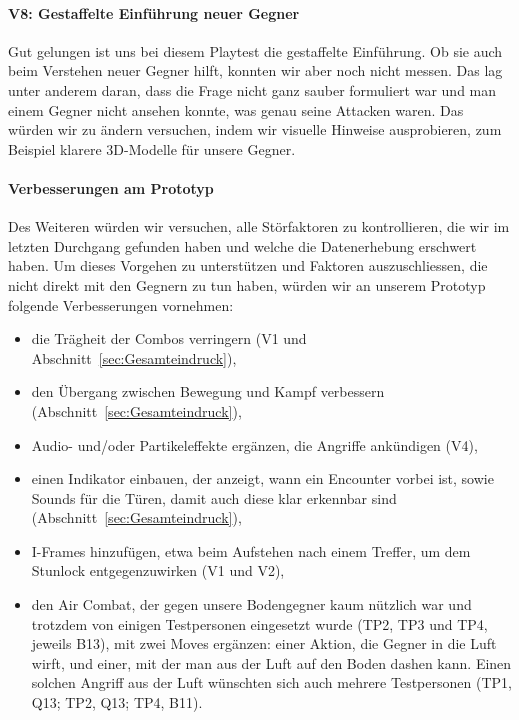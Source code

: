 \documentclass[../Main.tex]{subfiles}
\begin{document}
\paragraph{V8: Gestaffelte Einführung neuer Gegner}
Gut gelungen ist uns bei diesem Playtest die gestaffelte Einführung. Ob sie auch beim Verstehen neuer Gegner hilft, konnten wir aber noch nicht messen. Das lag unter anderem daran, dass die Frage nicht ganz sauber formuliert war und man einem Gegner nicht ansehen konnte, was genau seine Attacken waren. Das würden wir zu ändern versuchen, indem wir visuelle Hinweise ausprobieren, zum Beispiel klarere 3D-Modelle für unsere Gegner.

\paragraph{Verbesserungen am Prototyp}
Des Weiteren würden wir versuchen, alle Störfaktoren zu kontrollieren, die wir im letzten Durchgang gefunden haben und welche die Datenerhebung erschwert haben. Um dieses Vorgehen zu unterstützen und Faktoren auszuschliessen, die nicht direkt mit den Gegnern zu tun haben, würden wir an unserem Prototyp folgende Verbesserungen vornehmen:

\begin{itemize}[leftmargin=1.5cm]
    \item die Trägheit der Combos verringern (V1 und Abschnitt~\ref{sec:Gesamteindruck}),
    \item den Übergang zwischen Bewegung und Kampf verbessern (Abschnitt~\ref{sec:Gesamteindruck}),
    \item Audio- und/oder Partikeleffekte ergänzen, die Angriffe ankündigen (V4),
    \item einen Indikator einbauen, der anzeigt, wann ein Encounter vorbei ist, sowie Sounds für die Türen, damit auch diese klar erkennbar sind (Abschnitt~\ref{sec:Gesamteindruck}),
    \item I-Frames hinzufügen, etwa beim Aufstehen nach einem Treffer, um dem Stunlock entgegenzuwirken (V1 und V2),
    \item den Air Combat, der gegen unsere Bodengegner kaum nützlich war und trotzdem von einigen Testpersonen eingesetzt wurde (TP2, TP3 und TP4, jeweils B13), mit zwei Moves ergänzen: einer Aktion, die Gegner in die Luft wirft, und einer, mit der man aus der Luft auf den Boden dashen kann. Einen solchen Angriff aus der Luft wünschten sich auch mehrere Testpersonen (TP1, Q13; TP2, Q13; TP4, B11).
\end{itemize}
\end{document}
